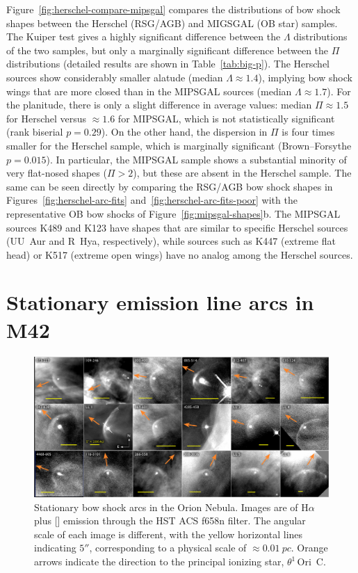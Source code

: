 \documentclass[useAMS, usenatbib, a4paper]{mnras}
\newcommand{\thC}{\(\theta^1\)\,Ori~C}
\begin{document}
Figure~\ref{fig:herschel-compare-mipsgal} compares the distributions
of bow shock shapes between the Herschel (RSG/AGB) and MIGSGAL (OB
star) samples.  The Kuiper test gives a highly significant
difference between the \(\Lambda\) distributions of the two samples, but
only a marginally significant difference between the \(\Pi\)
distributions (detailed results are shown in Table~\ref{tab:big-p}).
The Herschel sources show considerably smaller alatude (median
\(\Lambda \approx 1.4\)), implying bow shock wings that are more closed than in
the MIPSGAL sources (median \(\Lambda \approx 1.7\)).  For the planitude, there is
only a slight difference in average values: median \(\Pi \approx 1.5\) for
Herschel versus \(\approx 1.6\) for MIPSGAL, which is not statistically
significant (rank biserial \(p = 0.29\)).  On the other hand, the
dispersion in \(\Pi\) is four times smaller for the Herschel sample,
which is marginally significant (Brown--Forsythe \(p = 0.015\)).  In
particular, the MIPSGAL sample shows a substantial minority of very
flat-nosed shapes (\(\Pi > 2\)), but these are absent in the Herschel
sample.  The same can be seen directly by comparing the RSG/AGB bow
shock shapes in Figures~\ref{fig:herschel-arc-fits}
and~\ref{fig:herschel-arc-fits-poor} with the representative OB bow
shocks of Figure~\ref{fig:mipsgal-shapes}b.  The MIPSGAL sources K489
and K123 have shapes that are similar to specific Herschel sources
(UU~Aur and R~Hya, respectively), while sources such as K447 (extreme
flat head) or K517 (extreme open wings) have no analog among the
Herschel sources.

\section{Stationary emission line arcs in M42}
\label{sec:stat-emiss-line}

\begin{figure}
  \centering
  \includegraphics[width=\linewidth]{figs/annotated-ll-arcs}
  \vspace*{-\baselineskip}
  \caption[]{Stationary bow shock arcs in the Orion Nebula.  Images
    are of H\(\alpha\) plus [] emission through the HST ACS f658n
    filter. The angular scale of each image is different, with the
    yellow horizontal lines indicating \(5''\), corresponding to a
    physical scale of \(\approx\SI{0.01}{pc}\).  Orange arrows indicate the
    direction to the principal ionizing star, \thC. }
  \label{fig:ll-arcs}
\end{figure}
\end{document}
